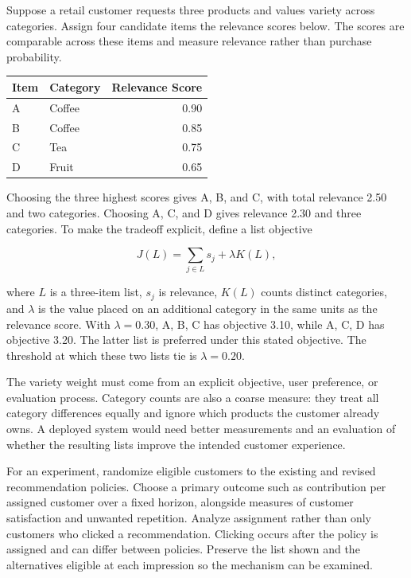 Suppose a retail customer requests three products and values variety
across categories. Assign four candidate items the relevance scores
below. The scores are comparable across these items and measure
relevance rather than purchase probability.

\begin{table}[H]
\centering\small
\begin{tabular}{@{}llr@{}}
\toprule
Item & Category & Relevance Score \\
\midrule

A & Coffee & 0.90 \\
B & Coffee & 0.85 \\
C & Tea & 0.75 \\
D & Fruit & 0.65 \\
\bottomrule
\end{tabular}
\end{table}

Choosing the three highest scores gives A, B, and C, with total
relevance 2.50 and two categories. Choosing A, C, and D gives relevance
2.30 and three categories. To make the tradeoff explicit, define a list
objective

\[
J(L)=\sum_{j\in L}s_j+\lambda K(L),
\]

where \(L\) is a three-item list, \(s_j\) is relevance, \(K(L)\) counts
distinct categories, and \(\lambda\) is the value placed on an
additional category in the same units as the relevance score. With
\(\lambda=0.30\), A, B, C has objective 3.10, while A, C, D has
objective 3.20. The latter list is preferred under this stated
objective. The threshold at which these two lists tie is
\(\lambda=0.20\).

The variety weight must come from an explicit objective, user
preference, or evaluation process. Category counts are also a coarse
measure: they treat all category differences equally and ignore which
products the customer already owns. A deployed system would need better
measurements and an evaluation of whether the resulting lists improve
the intended customer experience.

For an experiment, randomize eligible customers to the existing and
revised recommendation policies. Choose a primary outcome such as
contribution per assigned customer over a fixed horizon, alongside
measures of customer satisfaction and unwanted repetition. Analyze
assignment rather than only customers who clicked a recommendation.
Clicking occurs after the policy is assigned and can differ between
policies. Preserve the list shown and the alternatives eligible at each
impression so the mechanism can be examined.

